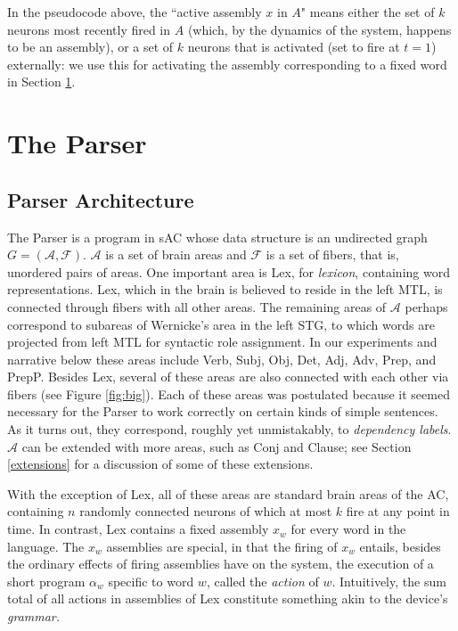 \documentclass[11pt,a4paper]{article}
\begin{document}
In the pseudocode above, the ``active assembly $x$ in $A$" means either the set of $k$ neurons most recently fired in $A$ (which, by the dynamics of the system, happens to be an assembly), or a set of $k$ neurons that is activated (set to fire at $t=1$) externally: we use this for activating the assembly corresponding to a fixed word in Section \ref{parser}.


\section{The Parser} \label{parser}

\subsection{Parser Architecture}
The Parser is a program in sAC whose data structure is an undirected graph $G=(\mathcal{A},\mathcal{F})$. $\mathcal{A}$ is a set of brain areas and $\mathcal{F}$ is a set of fibers, that is, unordered pairs of areas. One important area is {\sc Lex}, for {\em lexicon}, containing word representations.  {\sc Lex}, which in the brain is believed to reside in the left MTL, is connected through fibers with all other areas.  The remaining areas of $\mathcal{A}$ perhaps correspond to subareas of Wernicke's area in the left STG, to which words are projected from left MTL for syntactic role assignment.  In our experiments and narrative below these areas include {\sc Verb}, {\sc Subj}, {\sc Obj}, {\sc Det}, {\sc Adj}, {\sc Adv}, {\sc Prep}, and {\sc PrepP}. Besides {\sc Lex}, several of these areas are also connected with each other via fibers (see Figure \ref{fig:big}). Each of these areas was postulated because it seemed necessary for the Parser to work correctly on certain kinds of simple sentences.  As it turns out, they correspond, roughly yet unmistakably, to {\em dependency labels}. %
$\mathcal{A}$ can be extended with more areas, such as {\sc Conj} and {\sc Clause}; see Section \ref{extensions} for a discussion of some of these extensions. 

With the exception of {\sc Lex}, all of these areas are standard brain areas of the AC, containing $n$ randomly connected neurons of which at most $k$ fire at any point in time. In contrast, {\sc Lex} contains a fixed assembly $x_{{w}}$ for every word in the language. The $x_{{w}}$ assemblies are special, in that the firing of $x_{{w}}$ entails, besides the ordinary effects of firing assemblies have on the system, the execution of a short program $\alpha_w$ specific to word $w$, called the {\em action} of $w$.  Intuitively, the sum total of all actions in assemblies of {\sc Lex} constitute something akin to the device's {\em grammar.}
\end{document}
